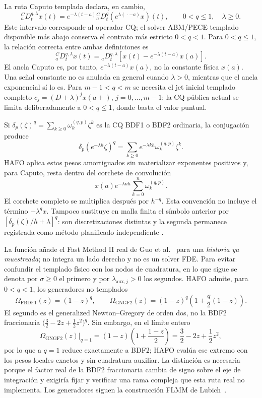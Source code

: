 La ruta Caputo templada declara, en cambio,
\[
 {}_a^CD_t^{q,\lambda}x(t)=e^{-\lambda(t-a)}{}_a^CD_t^q
 \left(e^{\lambda(\,\cdot-a)}x\right)(t),
 \qquad 0<q\leq1,\quad \lambda\ge0.
\]
Este intervalo corresponde al operador CQ; el solver ABM/PECE templado
disponible más abajo conserva el contrato más estricto \(0<q<1\).
Para \(0<q\leq1\), la relación correcta entre ambas definiciones es
\begin{equation}
 {}_a^CD_t^{q,\lambda}x(t)=
 {}_aD_t^{q,\lambda}
 \left[x(t)-e^{-\lambda(t-a)}x(a)\right].
 \label{eq:tempered-caputo-anchor}
\end{equation}
El ancla Caputo es, por tanto, \(e^{-\lambda(t-a)}x(a)\), no la constante
física \(x(a)\). Una señal constante no es anulada en general cuando
\(\lambda>0\), mientras que el ancla exponencial sí lo es. Para
\(m-1<q<m\) se necesita el jet inicial templado completo
\(c_j=(D+\lambda)^jx(a+)\), \(j=0,\ldots,m-1\); la CQ pública actual se
limita deliberadamente a \(0<q\leq1\), donde basta el valor puntual.

Si \(\delta_p(\zeta)^q=\sum_{k\ge0}\omega_k^{(q,p)}\zeta^k\) es la
CQ BDF1 o BDF2 ordinaria, la conjugación produce
\[
 \delta_p(e^{-\lambda h}\zeta)^q
 =\sum_{k\ge0}e^{-\lambda kh}\omega_k^{(q,p)}\zeta^k.
\]
HAFO aplica estos pesos amortiguados sin materializar exponentes positivos y,
para Caputo, resta dentro del corchete de convolución
\[
 x(a)e^{-\lambda nh}\sum_{k=0}^{n}\omega_k^{(q,p)}.
\]
El corchete completo se multiplica después por \(h^{-q}\).
Esta convención no incluye el término \(-\lambda^q x\). Tampoco sustituye en
malla finita el símbolo anterior por
\([\delta_p(\zeta)/h+\lambda]^q\): son discretizaciones distintas y la segunda
permanece registrada como método planificado independiente
\cite{ChenDeng2015,GuoEtAl2019Tempered,JinLiZhou2017}.

La función  añade el Fast Method II
real de Guo et al.~\cite{GuoEtAl2019Tempered} para una \emph{historia ya
muestreada}; no integra un lado derecho y no es un solver FDE. Para evitar
confundir el templado físico con los nodos de cuadratura, en lo que sigue se
denota por \(\sigma\ge0\) el primero y por
\(\lambda_{\mathrm{aux},j}>0\) los segundos. HAFO admite, para
\(0<q<1\), los generadores no templados
\begin{equation}
 \Omega_{\mathrm{FBDF1}}(z)=(1-z)^q,
 \qquad
 \Omega_{\mathrm{GNGF2}}(z)=(1-z)^q
 \left(1+\frac q2(1-z)\right).
 \label{eq:tempered-fast-generators}
\end{equation}
El segundo es el generalized Newton--Gregory de orden dos, no la BDF2
fraccionaria \(\bigl(\tfrac32-2z+\tfrac12z^2\bigr)^q\). Sin embargo, en el
límite entero
\[
 \Omega_{\mathrm{GNGF2}}(z)\big|_{q=1}
 =(1-z)\left(1+\frac{1-z}{2}\right)
 =\frac32-2z+\frac12z^2,
\]
por lo que a \(q=1\) reduce exactamente a BDF2; HAFO evalúa ese extremo con
los pesos locales exactos y sin cuadratura auxiliar. La distinción es
necesaria porque el factor real de la BDF2 fraccionaria cambia de signo sobre
el eje de integración y exigiría fijar y verificar una rama compleja que esta
ruta real no implementa. Los generadores siguen la construcción FLMM de
Lubich~\cite{Lubich1986}.

